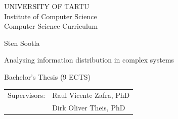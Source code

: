 \documentclass[12pt]{article}
\begin{document}
\thispagestyle{empty}
\begin{center}

\large
UNIVERSITY OF TARTU\\[2mm]
Institute of Computer Science\\
Computer Science Curriculum\\[2mm]

\vspace{25mm}

\Large Sten Sootla

\vspace{4mm}

\huge Analysing information distribution in complex systems

\vspace{20mm}

\Large Bachelor's Thesis (9 ECTS)

\end{center}

\vspace{2mm}

\begin{flushright}
 {
 \setlength{\extrarowheight}{5pt}
 \begin{tabular}{r l} 
  \sffamily Supervisors: & \sffamily Raul Vicente Zafra, PhD \\
  \sffamily & \sffamily Dirk Oliver Theis, PhD
 \end{tabular}
 }
\end{flushright}

\vspace{10mm}

\vspace{2mm}



\vspace{2mm}


\vspace{8mm}
\end{document}
